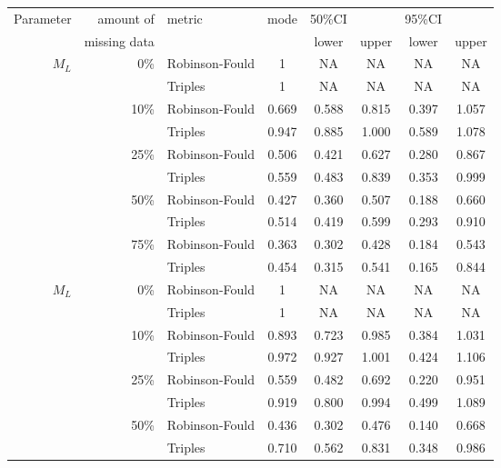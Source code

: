 \begin{tabular}{rrlccccc}
    \hline
    Parameter & amount of    & metric & mode & 50\%CI &       & 95\%CI &       \\
              & missing data &        &      & lower  & upper & lower  & upper \\
    \hline
    $M_L$     & 0\%          & Robinson-Fould & 1 & NA  & NA & NA  & NA \\
              &              & Triples        & 1 & NA  & NA & NA  & NA \\
              & 10\%         & Robinson-Fould & 0.669 & 0.588  & 0.815 & 0.397  & 1.057 \\ %
              &              & Triples        & 0.947 & 0.885  & 1.000 & 0.589  & 1.078 \\ %
              & 25\%         & Robinson-Fould & 0.506 & 0.421  & 0.627 & 0.280  & 0.867 \\ %
              &              & Triples        & 0.559 & 0.483  & 0.839 & 0.353  & 0.999 \\ %
              & 50\%         & Robinson-Fould & 0.427 & 0.360  & 0.507 & 0.188  & 0.660 \\ %
              &              & Triples        & 0.514 & 0.419  & 0.599 & 0.293  & 0.910 \\ %
              & 75\%         & Robinson-Fould & 0.363 & 0.302  & 0.428 & 0.184  & 0.543 \\ %
              &              & Triples        & 0.454 & 0.315  & 0.541 & 0.165  & 0.844 \\ %
    $M_L$     & 0\%          & Robinson-Fould & 1 & NA  & NA & NA  & NA \\
              &              & Triples        & 1 & NA  & NA & NA  & NA \\
              & 10\%         & Robinson-Fould & 0.893 & 0.723  & 0.985 & 0.384  & 1.031 \\ %
              &              & Triples        & 0.972 & 0.927  & 1.001 & 0.424  & 1.106 \\ %
              & 25\%         & Robinson-Fould & 0.559 & 0.482  & 0.692 & 0.220  & 0.951 \\ %
              &              & Triples        & 0.919 & 0.800  & 0.994 & 0.499  & 1.089 \\ %
              & 50\%         & Robinson-Fould & 0.436 & 0.302  & 0.476 & 0.140  & 0.668 \\ %
              &              & Triples        & 0.710 & 0.562  & 0.831 & 0.348  & 0.986 \\ %

\end{tabular}
